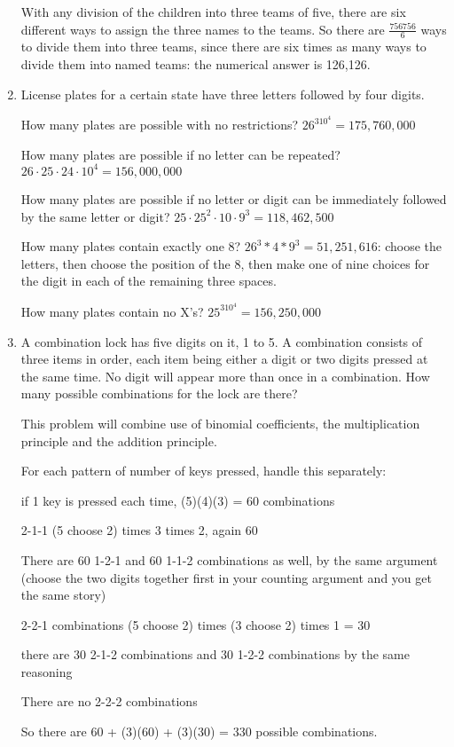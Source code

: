 \documentclass[12pt]{article}
\begin{document}
\begin{enumerate}
With any division of the children into three teams of five, there are six different ways to assign the three names to the teams.
So there are $\frac {756756}6$ ways to divide them into three teams, since there are six times as many ways to divide them into named teams:  the numerical answer is 126,126.

\newpage

\item  License plates for a certain state have three letters followed by four digits.

How many plates are possible with no restrictions?  $26^310^4=175,760,000$

How many plates are possible if no letter can be repeated?  $26\cdot25\cdot24\cdot 10^4 = 156,000,000$

How many plates are possible if no letter or digit can be immediately followed by the same letter or digit?
$25\cdot25^2\cdot 10 \cdot 9^3=118,462,500$

How many plates contain exactly one 8?  $26^3*4*9^3=51,251,616$:  choose the letters, then choose the position of the 8, then make one of nine choices for the digit in each of the remaining three spaces.

How many plates contain no X's?  $25^310^4 = 156,250,000$

\newpage

\item  A combination lock has five digits on it, 1 to 5.  A combination consists of three items in order, each item being either a digit
or two digits pressed at the same time.  No digit will appear more than once in a combination.  How many possible combinations for the lock are there?

This problem will combine use of binomial coefficients, the multiplication principle and the addition principle.

For each pattern of number of keys pressed, handle this separately:

if 1 key is pressed each time, (5)(4)(3) = 60 combinations

2-1-1  (5 choose 2) times 3 times 2, again 60

There are 60 1-2-1 and 60 1-1-2 combinations as well, by the same argument (choose the two digits together
first in your counting argument and you get the same story)

2-2-1 combinations (5 choose 2) times (3 choose 2) times 1 = 30

there are 30 2-1-2 combinations and 30 1-2-2 combinations by the same reasoning

There are no 2-2-2 combinations

So there are 60 + (3)(60) + (3)(30) = 330 possible combinations.

\end{enumerate}
\end{document}
